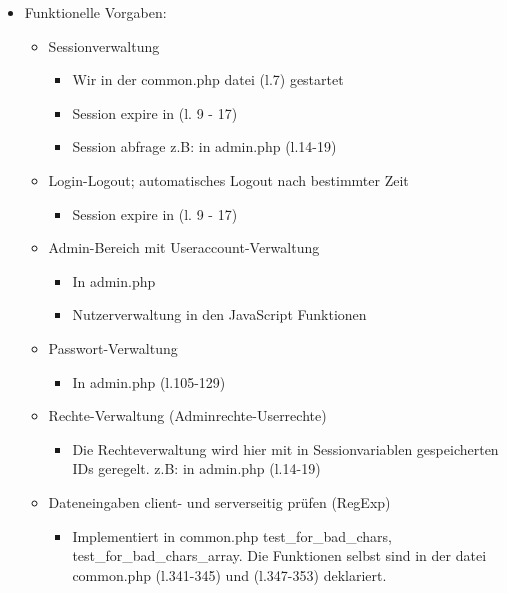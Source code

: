 \documentclass{report}
\begin{document}
\begin{itemize}
    \item Funktionelle Vorgaben:
    \begin{itemize}
        \item Sessionverwaltung
            \begin{itemize}
                \item Wir in der common.php datei (l.7) gestartet
                \item Session expire in (l. 9 - 17)
                \item Session abfrage z.B: in admin.php (l.14-19)
            \end{itemize}
        \item Login-Logout; automatisches Logout nach bestimmter Zeit\\
            \begin{itemize}
                \item Session expire in (l. 9 - 17) 
            \end{itemize}
        \item Admin-Bereich mit Useraccount-Verwaltung\\
            \begin{itemize}
                \item In admin.php
                \item Nutzerverwaltung in den JavaScript Funktionen 
            \end{itemize}
        \item Passwort-Verwaltung\\
            \begin{itemize}
                \item In admin.php (l.105-129)
            \end{itemize}
        \item Rechte-Verwaltung (Adminrechte-Userrechte)\\
            \begin{itemize}
                \item Die Rechteverwaltung wird hier mit in Sessionvariablen gespeicherten IDs geregelt.
                z.B: in admin.php (l.14-19)
            \end{itemize}
        \item Dateneingaben client- und serverseitig prüfen (RegExp)\\
            \begin{itemize}
                \item Implementiert in common.php test\_for\_bad\_chars, test\_for\_bad\_chars\_array. Die Funktionen selbst sind in der datei common.php (l.341-345) und (l.347-353) deklariert.

\end{itemize}
\end{itemize}
\end{itemize}
\end{document}
